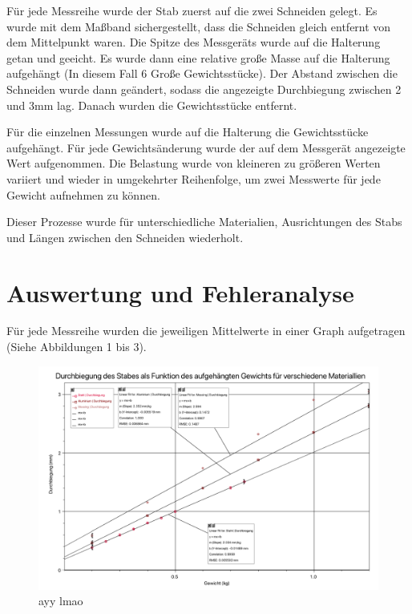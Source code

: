 \documentclass[11pt,a4paper]{article}
\begin{document}
Für jede Messreihe wurde der Stab zuerst auf die zwei Schneiden gelegt. Es wurde mit dem Maßband sichergestellt, dass die Schneiden gleich entfernt von dem Mittelpunkt waren. Die Spitze des Messgeräts wurde auf die Halterung getan und geeicht. Es wurde dann eine relative große Masse auf die Halterung aufgehängt (In diesem Fall 6 Große Gewichtsstücke). Der Abstand zwischen die Schneiden wurde dann geändert, sodass die angezeigte Durchbiegung zwischen 2 und 3mm lag. Danach wurden die Gewichtsstücke entfernt. 

Für die einzelnen Messungen wurde auf die Halterung die Gewichtsstücke aufgehängt. Für jede Gewichtsänderung wurde der auf dem Messgerät angezeigte Wert aufgenommen. Die Belastung wurde von kleineren zu größeren Werten variiert und wieder in umgekehrter Reihenfolge, um zwei Messwerte für jede Gewicht aufnehmen zu können. 

Dieser Prozesse wurde für unterschiedliche Materialien, Ausrichtungen des Stabs und  Längen zwischen den Schneiden wiederholt. 






\section{Auswertung und Fehleranalyse}
Für jede Messreihe wurden die jeweiligen Mittelwerte in einer Graph aufgetragen (Siehe Abbildungen 1 bis 3). 

\begin{figure}[h]
	\centering
	\includegraphics[width=\linewidth]{Abb2}
	\caption{ayy lmao}
\end{figure}
\end{document}
